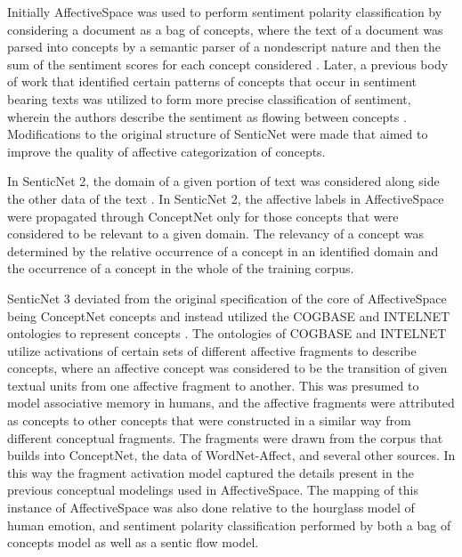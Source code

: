 \documentclass[letterpaper, 10 pt, conference]{ieeeconf}
\begin{document}
Initially AffectiveSpace was used to perform sentiment polarity classification by considering a document as a bag of concepts, where the text of a document was parsed into concepts by a semantic parser of a nondescript nature and then the sum of the sentiment scores for each concept considered \textcolor{gray}{\cite{CambriaSpeer}}. Later, a previous body of work that identified certain patterns of concepts that occur in sentiment bearing texts was utilized to form more precise classification of sentiment, wherein the authors describe the sentiment as flowing between concepts \textcolor{gray}{\cite{CambriaPoria}}. Modifications to the original structure of SenticNet were made that aimed to improve the quality of affective categorization of concepts.

In SenticNet 2, the domain of a given portion of text was considered along side the other data of the text \textcolor{gray}{\cite{CambriaHavasi}}. In SenticNet 2, the affective labels in AffectiveSpace were propagated through ConceptNet only for those concepts that were considered to be relevant to a given domain. The relevancy of a concept was determined by the relative occurrence of a concept in an identified domain and the occurrence of a concept in the whole of the training corpus.

SenticNet 3 deviated from the original specification of the core of AffectiveSpace being ConceptNet concepts and instead utilized the COGBASE and INTELNET ontologies to represent concepts \textcolor{gray}{\cite{CambriaOlsher}}. The ontologies of COGBASE and INTELNET utilize activations of certain sets of different affective fragments to describe concepts, where an affective concept was considered to be the transition of given textual units from one affective fragment to another. This was presumed to model associative memory in humans, and the affective fragments were attributed as concepts to other concepts that were constructed in a similar way from different conceptual fragments. The fragments were drawn from the corpus that builds into ConceptNet, the data of WordNet-Affect, and several other sources. In this way the fragment activation model captured the details present in the previous conceptual modelings used in AffectiveSpace. The mapping of this instance of AffectiveSpace was also done relative to the hourglass model of human emotion, and sentiment polarity classification performed by both a bag of concepts model as well as a sentic flow model.
\end{document}
